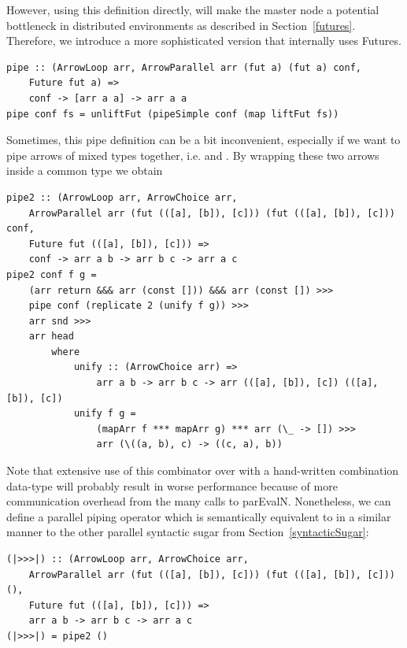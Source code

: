 However, using this definition directly, will make the master node a potential bottleneck in distributed environments as described in Section~\ref{futures}. Therefore, we introduce a more sophisticated version that internally uses Futures.
\begin{lstlisting}[frame=htrbl]
pipe :: (ArrowLoop arr, ArrowParallel arr (fut a) (fut a) conf,
	Future fut a) =>
	conf -> [arr a a] -> arr a a
pipe conf fs = unliftFut (pipeSimple conf (map liftFut fs))
\end{lstlisting}
Sometimes, this pipe definition can be a bit inconvenient, especially if we want to pipe arrows of mixed types together, i.e.  and . By wrapping these two arrows inside a common type we obtain
\begin{lstlisting}[frame=htrbl]
pipe2 :: (ArrowLoop arr, ArrowChoice arr,
	ArrowParallel arr (fut (([a], [b]), [c])) (fut (([a], [b]), [c])) conf,
	Future fut (([a], [b]), [c])) =>
	conf -> arr a b -> arr b c -> arr a c
pipe2 conf f g = 
	(arr return &&& arr (const [])) &&& arr (const []) >>>
	pipe conf (replicate 2 (unify f g)) >>>
	arr snd >>>
	arr head
		where
			unify :: (ArrowChoice arr) =>
				arr a b -> arr b c -> arr (([a], [b]), [c]) (([a], [b]), [c])
			unify f g =
				(mapArr f *** mapArr g) *** arr (\_ -> []) >>>
				arr (\((a, b), c) -> ((c, a), b))
\end{lstlisting}
Note that extensive use of this combinator over  with a hand-written combination data-type will probably result in worse performance because of more communication overhead from the many calls to parEvalN. Nonetheless, we can define a parallel piping operator \code{|>>>|} which is semantically equivalent to \code{>>>} in a similar manner to the other parallel syntactic sugar from Section~\ref{syntacticSugar}:
\begin{lstlisting}[frame=htrbl]
(|>>>|) :: (ArrowLoop arr, ArrowChoice arr,
	ArrowParallel arr (fut (([a], [b]), [c])) (fut (([a], [b]), [c])) (),
	Future fut (([a], [b]), [c])) =>
	arr a b -> arr b c -> arr a c
(|>>>|) = pipe2 ()
\end{lstlisting}

